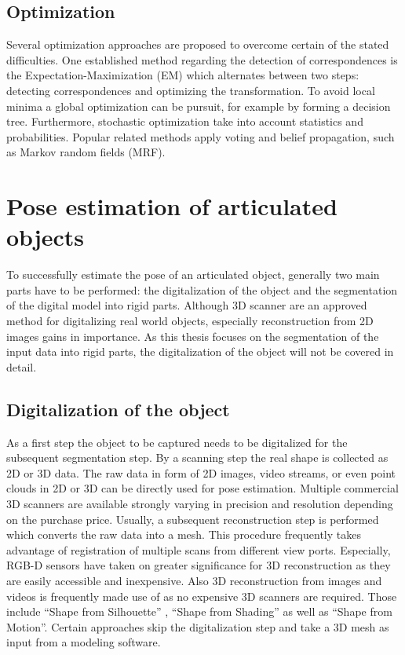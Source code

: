 \subsection{Optimization}
Several optimization approaches are proposed to overcome certain of the stated difficulties. One established method regarding the detection of correspondences is the Expectation-Maximization (EM) which alternates between two steps: detecting correspondences and optimizing the transformation. To avoid local minima a global optimization can be pursuit, for example by forming a decision tree. Furthermore, stochastic optimization take into account statistics and probabilities. Popular related methods apply voting and belief propagation, such as Markov random fields (MRF). 
%
\section{Pose estimation of articulated objects}
\label{poseEstimation}


To successfully estimate the pose of an articulated object, generally two main parts have to be performed: the digitalization of the object and the segmentation of the digital model into rigid parts. Although 3D scanner are an approved method for digitalizing real world objects, especially reconstruction from 2D images gains in importance. As this thesis focuses on the segmentation of the input data into rigid parts, the digitalization of the object will not be covered in detail.

\subsection{Digitalization of the object}
\label{sec:reconstruction}
As a first step the object to be captured needs to be digitalized for the subsequent segmentation step. By a scanning step the real shape is collected as 2D or 3D data. The raw data in form of 2D images, video streams, or even point clouds in 2D or 3D can be directly used for pose estimation. Multiple commercial 3D scanners are available strongly varying in precision and resolution depending on the purchase price. Usually, a subsequent reconstruction step is performed which converts the raw data into a mesh. This procedure frequently takes advantage of registration of multiple scans from different view ports. Especially, RGB-D sensors have taken on greater significance for 3D reconstruction \cite{registrationHuman} as they are easily accessible and inexpensive. Also 3D reconstruction from images and videos is frequently made use of as no expensive 3D scanners are required. Those include ``Shape from Silhouette'' \cite{mocap}\cite{sfsMocap}, ``Shape from Shading'' as well as ``Shape from Motion''. Certain approaches skip the digitalization step and take a 3D mesh as input from a modeling software. 
%
%
